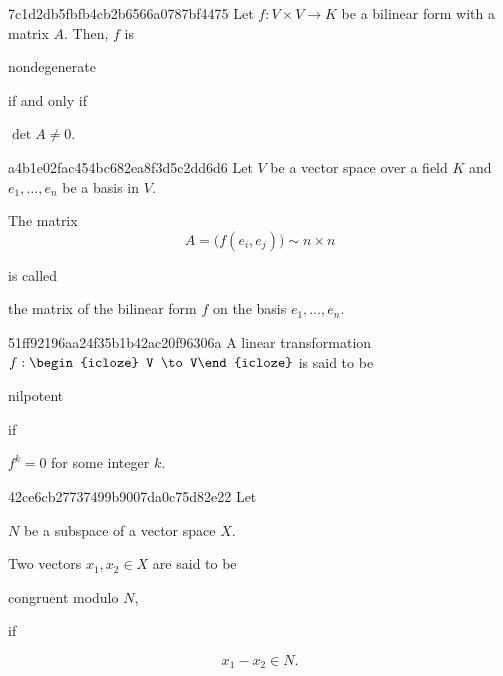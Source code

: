 \begin{note}{7c1d2db5fbfb4cb2b6566a0787bf4475}
    Let \( f : V \times V \to K \) be a bilinear form with a matrix \( A \).
    Then, \( f \) is \begin{icloze}{2}nondegenerate\end{icloze} \begin{icloze}{3}if and only if\end{icloze} \begin{icloze}{1}\( \det A \neq 0 \).\end{icloze}
\end{note}

\begin{note}{a4b1e02fac454bc682ea8f3d5c2dd6d6}
    Let \( V \) be a vector space over a field \( K \) and \( e_1,\ldots, e_n \) be a basis in \( V \).
    \begin{icloze}{1}The matrix
    \[
        A = \Big(f(e_i, e_j)\Big) \sim n \times n
    \]\end{icloze}
    is called \begin{icloze}{2}the matrix of the bilinear form \( f \) on the basis \( e_1, \ldots, e_n \).\end{icloze}
\end{note}

\begin{note}{51ff92196aa24f35b1b42ac20f96306a}
    A linear transformation \({ f : \begin{icloze}{3}V \to V\end{icloze} }\) is said to be \begin{icloze}{2}nilpotent\end{icloze} if \begin{icloze}{1}\({ f^{k} = 0 }\) for some integer \({ k }\).\end{icloze}
\end{note}

\begin{note}{42ce6cb27737499b9007da0c75d82e22}
    Let \begin{icloze}{3}\({ N }\) be a subspace of a vector space \({ X }\).\end{icloze}
    Two vectors \({ x_1, x_2 \in X }\) are said to be \begin{icloze}{2}congruent modulo \({ N }\),\end{icloze} if
    \begin{icloze}{1}
        \[
            x_1 - x_2 \in N.
        \]
    \end{icloze}
\end{note}

